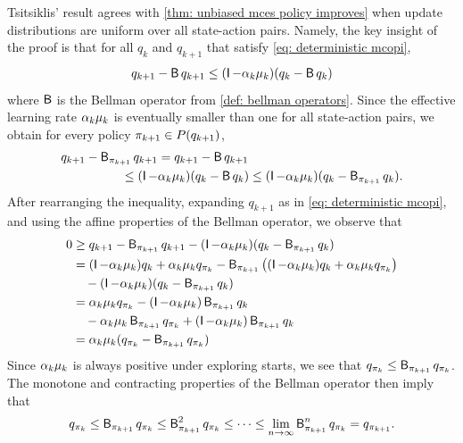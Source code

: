 \begin{remark}
Tsitsiklis' result agrees with \autoref{thm: unbiased mces policy improves} when update distributions are uniform over all state-action pairs.
Namely, the key insight of the proof is that for all $q_k$ and $q_{k+1}$ that satisfy \eqref{eq: deterministic mcopi},
\begin{align*}
    q_{k+1} - \operatorname{\mathsf{B}} q_{k+1} \leq (\operatorname{\mathsf{I}} - \alpha_k \mu_k) (q_k - \operatorname{\mathsf{B}} q_k) 
\end{align*}
where $\operatorname{\mathsf{B}}$ is the Bellman operator from \autoref{def: bellman operators}.
Since the effective learning rate $\alpha_k \mu_k$ is eventually smaller than one for all state-action pairs, 
we obtain
for every policy $\pi_{k+1} \in P(q_{k+1})$,
\begin{align*}
    &q_{k+1} - \operatorname{\mathsf{B}}_{\pi_{k+1}} q_{k+1}
    = q_{k+1} - \operatorname{\mathsf{B}} q_{k+1}
    \\
    & \hspace{1.7cm} \leq (\operatorname{\mathsf{I}} - \alpha_k \mu_k) (q_k - \operatorname{\mathsf{B}} q_k)
    \leq (\operatorname{\mathsf{I}} - \alpha_k \mu_k) (q_k - \operatorname{\mathsf{B}}_{\pi_{k+1}} q_k ) .
\end{align*}
After rearranging the inequality, expanding $q_{k+1}$ as in \eqref{eq: deterministic mcopi},
and using the affine properties of the Bellman operator,
we observe that
\begin{align*}
    0 &\geq q_{k+1} - \operatorname{\mathsf{B}}_{\pi_{k+1}} q_{k+1} - (\operatorname{\mathsf{I}} - \alpha_k \mu_k) ( q_k - \operatorname{\mathsf{B}}_{\pi_{k+1}} q_k )
    \\
    &= (\operatorname{\mathsf{I}}-\alpha_k \mu_k) q_k + \alpha_k \mu_k q_{\pi_k}
    - \operatorname{\mathsf{B}}_{\pi_{k+1}} \big( (\operatorname{\mathsf{I}}-\alpha_k \mu_k) q_k + \alpha_k \mu_k q_{\pi_k} \big)
    \\
    &\quad - (\operatorname{\mathsf{I}}-\alpha_k \mu_k) ( q_k - \operatorname{\mathsf{B}}_{\pi_{k+1}} q_k)
    \\
    &= \alpha_k \mu_k q_{\pi_k} - (\operatorname{\mathsf{I}}-\alpha_k \mu_k) \operatorname{\mathsf{B}}_{\pi_{k+1}} q_k 
    \\
    &\quad - \alpha_k \mu_k \operatorname{\mathsf{B}}_{\pi_{k+1}}  q_{\pi_k} + (\operatorname{\mathsf{I}}-\alpha_k \mu_k) \operatorname{\mathsf{B}}_{\pi_{k+1}} q_k
    \\
    &= \alpha_k \mu_k ( q_{\pi_k} - \operatorname{\mathsf{B}}_{\pi_{k+1}} q_{\pi_k} )
\end{align*}
Since $\alpha_k \mu_k$ is always positive under exploring starts, we see that $q_{\pi_k} \leq \operatorname{\mathsf{B}}_{\pi_{k+1}} q_{\pi_k}$.
The monotone and contracting properties of the Bellman operator then imply that 
\begin{align*}
    q_{\pi_k} 
    \leq \operatorname{\mathsf{B}}_{\pi_{k+1}} q_{\pi_k} 
    \leq \operatorname{\mathsf{B}}_{\pi_{k+1}}^2 q_{\pi_k}
    \leq \dots
    \leq \lim_{n \to \infty} \operatorname{\mathsf{B}}_{\pi_{k+1}}^n q_{\pi_k}
    = q_{\pi_{k+1}} .
\end{align*}


\end{remark}
